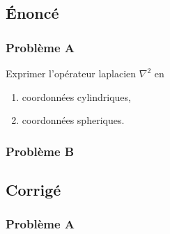 \documentclass
[
a4paper,                      %
twoside,					  %
12pt,                         %
abstract,		      %
fleqn,                        %
]
{scrartcl} %
\begin{document}
\subsection{\'Enonc\'e}

\subsubsection{Probl\`eme A}

Exprimer l'op\'erateur laplacien $\nabla^{2}$ en

\begin{enumerate}
\item coordonn\'ees cylindriques,
\item coordonn\'ees spheriques.
\end{enumerate}

\subsubsection{Probl\`eme B}

\subsection{Corrig\'e}

\subsubsection{Probl\`eme A}
\end{document}
